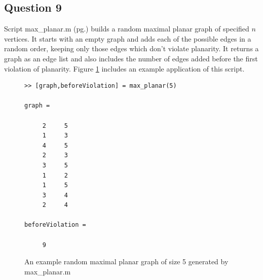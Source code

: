 \documentclass[a4paper]{article}
\begin{document}
\subsection*{Question 9}

Script max\_planar.m (pg.\pageref{Pmax_planar}) builds a random maximal planar graph of specified $n$ vertices. It starts with an empty graph and adds each of the possible edges in a random order, keeping only those edges which don't violate planarity. It returns a graph as an edge list and also includes the number of edges added before the first violation of planarity. Figure \ref{fig:Q9ex} includes an example application of this script.

\begin{figure}[H]
    \centering
    \begin{minipage}{0.48\textwidth}
        \centering
        \begin{verbatim}
>> [graph,beforeViolation] = max_planar(5)

graph =

     2     5
     1     3
     4     5
     2     3
     3     5
     1     2
     1     5
     3     4
     2     4

beforeViolation =

     9
        \end{verbatim}
    \end{minipage}\hfill
    \begin{minipage}{0.48\textwidth}
        \centering
    \end{minipage}
    \caption{An example random maximal planar graph of size 5 generated by max\_planar.m}
    \label{fig:Q9ex}
\end{figure}
\end{document}
